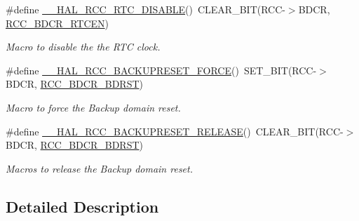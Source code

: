 \begin{DoxyCompactItemize}
\#define \hyperlink{group___r_c_c___r_t_c___clock___configuration_gaab5eeb81fc9f0c8d4450069f7a751855}{\+\_\+\+\_\+\+H\+A\+L\+\_\+\+R\+C\+C\+\_\+\+R\+T\+C\+\_\+\+D\+I\+S\+A\+B\+LE}()~C\+L\+E\+A\+R\+\_\+\+B\+IT(R\+CC-\/$>$B\+D\+CR, \hyperlink{group___peripheral___registers___bits___definition_ga79ea6f2df75f09b17df9582037ed6a53}{R\+C\+C\+\_\+\+B\+D\+C\+R\+\_\+\+R\+T\+C\+EN})
\begin{DoxyCompactList}\small\item\em Macro to disable the the R\+TC clock. \end{DoxyCompactList}\item 
\#define \hyperlink{group___r_c_c___r_t_c___clock___configuration_ga3bf7da608ff985873ca8e248fb1dc4f0}{\+\_\+\+\_\+\+H\+A\+L\+\_\+\+R\+C\+C\+\_\+\+B\+A\+C\+K\+U\+P\+R\+E\+S\+E\+T\+\_\+\+F\+O\+R\+CE}()~S\+E\+T\+\_\+\+B\+IT(R\+CC-\/$>$B\+D\+CR, \hyperlink{group___peripheral___registers___bits___definition_ga2b85b3ab656dfa2809b15e6e530c17a2}{R\+C\+C\+\_\+\+B\+D\+C\+R\+\_\+\+B\+D\+R\+ST})
\begin{DoxyCompactList}\small\item\em Macro to force the Backup domain reset. \end{DoxyCompactList}\item 
\mbox{\label{group___r_c_c___r_t_c___clock___configuration_ga14f32622c65f4ae239ba8cb00d510321}} 
\#define \hyperlink{group___r_c_c___r_t_c___clock___configuration_ga14f32622c65f4ae239ba8cb00d510321}{\+\_\+\+\_\+\+H\+A\+L\+\_\+\+R\+C\+C\+\_\+\+B\+A\+C\+K\+U\+P\+R\+E\+S\+E\+T\+\_\+\+R\+E\+L\+E\+A\+SE}()~C\+L\+E\+A\+R\+\_\+\+B\+IT(R\+CC-\/$>$B\+D\+CR, \hyperlink{group___peripheral___registers___bits___definition_ga2b85b3ab656dfa2809b15e6e530c17a2}{R\+C\+C\+\_\+\+B\+D\+C\+R\+\_\+\+B\+D\+R\+ST})
\begin{DoxyCompactList}\small\item\em Macros to release the Backup domain reset. \end{DoxyCompactList}\end{DoxyCompactItemize}


\subsection{Detailed Description}


